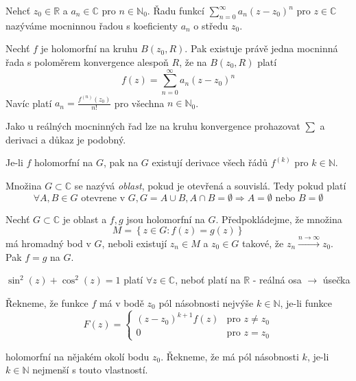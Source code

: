 \begin{definice}
Nehcť $z_0 \in \mathbb{R}$ a $a_n \in \mathbb{C}$ pro $n \in \mathbb{N}_0$. Řadu funkcí $\sum_{n=0}^{\infty} a_n (z-z_0)^n$ pro $z \in \mathbb{C}$ nazýváme mocninnou řadou s koeficienty $a_n$ o středu $z_0$.
\end{definice}

\begin{vetat}
Nechť $f$ je holomorfní na kruhu $B(z_0, R)$. Pak existuje právě jedna mocninná řada s poloměrem konvergence alespoň $R$, že na $B(z_0, R)$ platí
$$f(z) = \sum_{n=0}^\infty a_n (z-z_0)^n$$
Navíc platí $a_n = \frac{f^{(n)}(z_0)}{n!}$ pro všechna $n \in \mathbb{N}_0$.
\end{vetat}

Jako u reálných mocninných řad lze na kruhu konvergence prohazovat $\sum$ a derivaci a důkaz je podobný.

\begin{dusledek}
Je-li $f$ holomorfní na $G$, pak na $G$ existují derivace všech řádů $f^{(k)}$ pro $k \in \mathbb{N}$.
\end{dusledek}

\begin{definice}
Množina $G \subset \mathbb{C}$ se nazývá \emph{oblast}, pokud je otevřená a souvislá. Tedy pokud platí
$$\forall A, B \in G \textrm{ otevrene v } G, G=A \cup B, A \cap B = \emptyset \Rightarrow A = \emptyset \textrm{ nebo } B = \emptyset$$
\end{definice}

\begin{vetal}
Nechť $G \subset \mathbb{C}$ je oblast a $f, g$ jsou holomorfní na $G$. Předpokládejme, že množina
$$M = \left\{ z \in G : f(z)=g(z) \right\} $$
má hromadný bod v $G$, neboli existují $z_n \in M$ a $z_0 \in G$ takové, že $z_n \stackrel{n \rightarrow \infty}{\rightarrow} z_0$. Pak $f=g$ na $G$.
\end{vetal}

\begin{dusledek}
$\sin^2 (z) + \cos^2 (z) = 1$ platí $\forall z \in \mathbb{C}$, neboť platí na $\mathbb{R}$ - reálná osa $\to$ úsečka
\end{dusledek}


\begin{definice}
Řekneme, že funkce $f$ má v bodě $z_0$ pól násobnosti nejvýše $k \in \mathbb{N}$, je-li funkce 
\begin{equation}
F(z) = \left\{ \begin{array}{ll}
 (z-z_0)^{k+1}f(z) & \textrm{pro $z \neq z_0$} \nonumber\\
 0 & \textrm{pro $z=z_0$}
  \end{array} \right.
\end{equation}

holomorfní na nějakém okolí bodu $z_0$. Řekneme, že má pól násobnosti $k$, je-li $k \in \mathbb{N}$ nejmenší s touto vlastností.
\end{definice}


